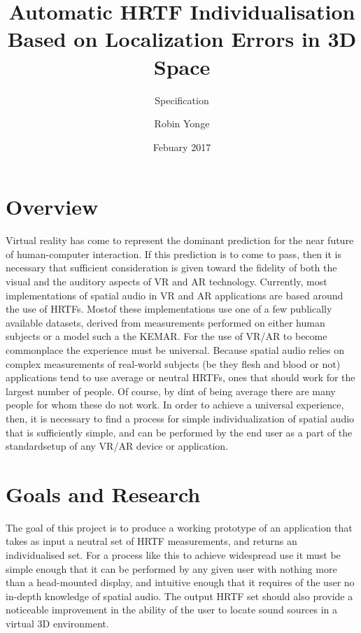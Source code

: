 \documentclass[10pt, oneside, a4paper, draft]{scrartcl}
\begin{document}

\title{Automatic HRTF Individualisation Based on Localization Errors in 3D Space}
\subtitle{Specification}
\author{Robin Yonge}
\date{Febuary 2017}
\maketitle


\section*{Overview}
Virtual reality has come to represent the dominant prediction for the near future of human-computer interaction\cite{source??}. If this prediction is to come to pass, then it is necessary that sufficient consideration is given toward the fidelity of both the visual and the auditory aspects of VR and AR technology. Currently, most implementations of spatial audio in VR and AR applications are based around the use of HRTFs. Mostof these implementations use one of a few publically available datasets, derived from measurements performed on either human subjects or a model such a the KEMAR\cite{Algazi2001}\cite{Gardner1994}. For the use of VR/AR to become commonplace the experience must be universal. Because spatial audio relies on complex measurements of real-world subjects (be they flesh and blood or not) applications tend to use average or neutral HRTFs, ones that should work for the largest number of people. Of course, by dint of being average there are many people for whom these do not work. In order to achieve a universal experience, then, it is necessary to find a process for  simple individualization of spatial audio that is sufficiently simple, and can be performed by the end user as a part of the standardsetup of any VR/AR device or application.


\section*{Goals and Research}
The goal of this project is to produce a working prototype of an application that takes as input a neutral set of HRTF measurements, and returns an individualised set. For a process like this to achieve widespread use it must be simple enough that it can be performed by any given user with nothing more than a head-mounted display, and intuitive enough that it requires of the user no in-depth knowledge of spatial audio. The output HRTF set should also provide a noticeable improvement in the ability of the user to locate sound sources in a virtual 3D environment.
\end{document}

